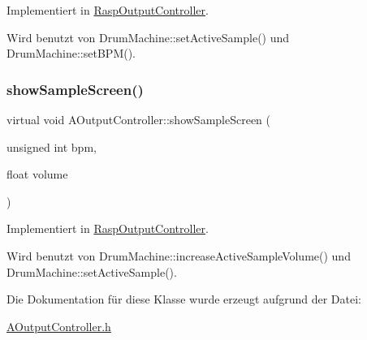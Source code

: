 Implementiert in \hyperlink{class_rasp_output_controller_ad195a3d664b7c7e5680cd8949203c1fc}{Rasp\+Output\+Controller}.



Wird benutzt von Drum\+Machine\+::set\+Active\+Sample() und Drum\+Machine\+::set\+B\+P\+M().

\mbox{\label{class_a_output_controller_aab53d12a6aa6f38d0e4ead69e85ed4fe}} 
\subsubsection{\texorpdfstring{show\+Sample\+Screen()}{showSampleScreen()}}
{\footnotesize\ttfamily virtual void A\+Output\+Controller\+::show\+Sample\+Screen (\begin{DoxyParamCaption}\item[{unsigned int}]{bpm,  }\item[{float}]{volume }\end{DoxyParamCaption})\hspace{0.3cm}{\ttfamily [pure virtual]}}



Implementiert in \hyperlink{class_rasp_output_controller_a613d3a1d1ceb31875be95e4a4b733fba}{Rasp\+Output\+Controller}.



Wird benutzt von Drum\+Machine\+::increase\+Active\+Sample\+Volume() und Drum\+Machine\+::set\+Active\+Sample().



Die Dokumentation für diese Klasse wurde erzeugt aufgrund der Datei\+:\begin{DoxyCompactItemize}
\item 
\hyperlink{_a_output_controller_8h}{A\+Output\+Controller.\+h}\end{DoxyCompactItemize}
